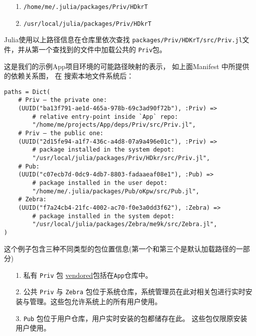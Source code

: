 \begin{itemize}
\item[1. ] \texttt{/home/me/.julia/packages/Priv/HDkrT}


\item[2. ] \texttt{/usr/local/julia/packages/Priv/HDkrT}

\end{itemize}


Julia使用以上路径信息在仓库里依次查找 \texttt{packages/Priv/HDKrT/src/Priv.jl}文件，并从第一个查找到的文件中加载公共的 \texttt{Priv}包。



这是我们的示例App项目环境的可能路径映射的表示，  如上面Manifest 中所提供的依赖关系图， 在 搜索本地文件系统后：




\begin{verbatim}
paths = Dict(
    # Priv – the private one:
    (UUID("ba13f791-ae1d-465a-978b-69c3ad90f72b"), :Priv) =>
        # relative entry-point inside `App` repo:
        "/home/me/projects/App/deps/Priv/src/Priv.jl",
    # Priv – the public one:
    (UUID("2d15fe94-a1f7-436c-a4d8-07a9a496e01c"), :Priv) =>
        # package installed in the system depot:
        "/usr/local/julia/packages/Priv/HDkr/src/Priv.jl",
    # Pub:
    (UUID("c07ecb7d-0dc9-4db7-8803-fadaaeaf08e1"), :Pub) =>
        # package installed in the user depot:
        "/home/me/.julia/packages/Pub/oKpw/src/Pub.jl",
    # Zebra:
    (UUID("f7a24cb4-21fc-4002-ac70-f0e3a0dd3f62"), :Zebra) =>
        # package installed in the system depot:
        "/usr/local/julia/packages/Zebra/me9k/src/Zebra.jl",
)
\end{verbatim}



这个例子包含三种不同类型的包位置信息(第一个和第三个是默认加载路径的一部分)



\begin{itemize}
\item[1. ] 私有 \texttt{Priv} 包 {\textquotedbl}\href{https://stackoverflow.com/a/35109534}{vendored}{\textquotedbl}包括在\texttt{App}仓库中。


\item[2. ] 公共 \texttt{Priv} 与 \texttt{Zebra} 包位于系统仓库，系统管理员在此对相关包进行实时安装与管理。这些包允许系统上的所有用户使用。


\item[3. ] \texttt{Pub} 包位于用户仓库，用户实时安装的包都储存在此。 这些包仅限原安装用户使用。

\end{itemize}


